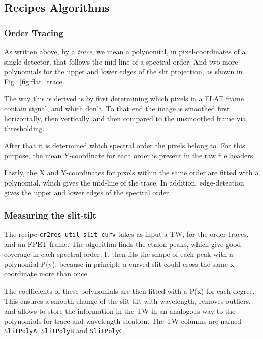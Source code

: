 \subsection{Recipes Algorithms} 
\label{sec:algorithms-recipes}


\subsubsection{Order Tracing}
\label{sec:ordertrace}

As written above, by a \emph{trace}, we mean a polynomial, in pixel-coordinates
of a single detector, that follows the mid-line of a spectral order. And two
more polynomials for the upper and lower edges of the slit projection, as shown
in Fig.~\ref{fig:flat_trace}.

The way this is derived is by first determining which pixels in a FLAT frame
contain signal, and which don't. To that end the image is smoothed first
horizontally, then vertically, and then compared to the unsmoothed frame via
thresholding.

After that it is determined which spectral order the pixels belong to. For this
purpose, the mean Y-coordinate for each order is present in the raw file
headers.

Lastly, the X and Y-coordinates for pixels within the same order are fitted with
a polynomial, which gives the mid-line of the trace. In addition, edge-detection
gives the upper and lower edges of the spectral order.

\subsubsection{Measuring the slit-tilt}
\label{sec:tilt}

The recipe \verb!cr2res_util_slit_curv! takes as input a TW, for the order
traces, and an FPET frame. The algorithm finds the etalon peaks, which give good
coverage in each spectral order. It then fits the shape of each peak with a
polynomial P(y), because in principle a curved slit could cross the same
x-coordinate more than once.

The coefficients of these polynomials are then fitted with a P(x) for each
degree. This ensures a smooth change of the slit tilt with wavelength, removes
outliers, and allows to store the information in the TW in an analogous way to
the polynomials for trace and wavelength solution. The TW-columns are named
\verb!SlitPolyA!, \verb!SlitPolyB! and \verb!SlitPolyC!.


